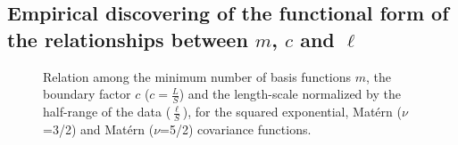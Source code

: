 
\subsection{Empirical discovering of the functional form of the relationships between $m$, $c$ and $\ell$} \label{subsec_empiric_relations}

\begin{figure}
\centering
{}
\caption{Relation among the minimum number of basis functions $m$, the boundary factor $c$ \hspace{0.1mm} ($c = \frac{L}{S}$) \hspace{0.1mm} and the length-scale normalized by the half-range of the data ($\frac{\ell}{S}$), for the squared exponential, Mat\'ern ($\nu$=3/2) and Mat\'ern ($\nu$=5/2) covariance functions.}
  \label{fig6_relationships}
\end{figure}

